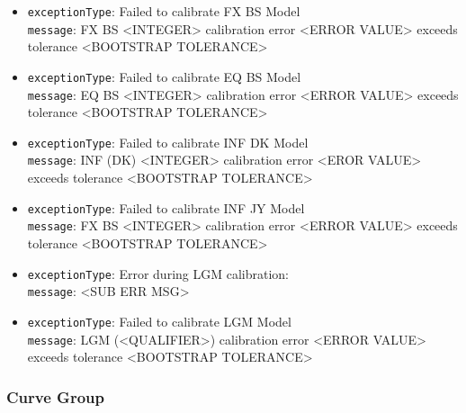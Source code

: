 \begin{itemize}

  \item \lstinline!exceptionType!: Failed to calibrate FX BS Model \\
        \lstinline!message!: FX BS <INTEGER> calibration error <ERROR VALUE> exceeds tolerance <BOOTSTRAP TOLERANCE>

  \item \lstinline!exceptionType!: Failed to calibrate EQ BS Model \\
        \lstinline!message!: EQ BS <INTEGER> calibration error <ERROR VALUE> exceeds tolerance <BOOTSTRAP TOLERANCE>

  \item \lstinline!exceptionType!: Failed to calibrate INF DK Model \\
        \lstinline!message!: INF (DK) <INTEGER> calibration error <EROR VALUE> exceeds tolerance <BOOTSTRAP TOLERANCE>

  \item \lstinline!exceptionType!: Failed to calibrate INF JY Model \\
        \lstinline!message!: FX BS <INTEGER> calibration error <ERROR VALUE> exceeds tolerance <BOOTSTRAP TOLERANCE>

  \item \lstinline!exceptionType!: Error during LGM calibration: \\
        \lstinline!message!: <SUB ERR MSG>

  \item \lstinline!exceptionType!: Failed to calibrate LGM Model \\
        \lstinline!message!: LGM (<QUALIFIER>) calibration error <ERROR VALUE> exceeds tolerance <BOOTSTRAP TOLERANCE>

\end{itemize}

\subsubsection*{Curve Group}


